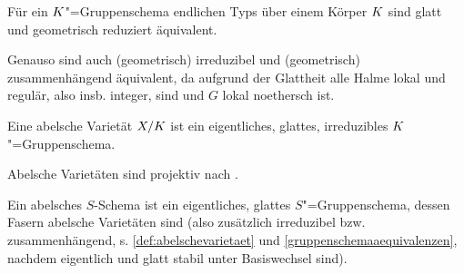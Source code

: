 \documentclass[german]{scrreprt}
\begin{document}
\begin{Definition}[$S$"=Gruppenschema]
\begin{Bemerkung}\label{gruppenschemaaequivalenzen}
    Für ein $K$"=Gruppenschema endlichen Typs über einem Körper $K$
    sind glatt und geometrisch reduziert äquivalent.
    
    Genauso sind auch (geometrisch) irreduzibel und (geometrisch)
    zusammenhängend äquivalent, da aufgrund der Glattheit alle Halme
    lokal und regulär, also insb. integer, sind und $G$ lokal noethersch
    ist.
  \end{Bemerkung}
\end{Definition}
\begin{Definition}\label{def:abelschevarietaet}
  Eine abelsche Varietät $X/K$ ist ein eigentliches, glattes,
  irreduzibles $K$"=Gruppenschema.


  \begin{Bemerkung}\label{thm:abvarietaetprojektiv}
    Abelsche Varietäten sind projektiv nach
    \cite[9.6, Proposition 4]{bosch}.
  \end{Bemerkung}
\end{Definition}

\begin{Definition}
  Ein abelsches $S$-Schema ist ein eigentliches, glattes $S$"=Gruppenschema,
  dessen Fasern abelsche Varietäten sind 
  (also zusätzlich irreduzibel bzw. zusammenhängend,
  s. \ref{def:abelschevarietaet} und \ref{gruppenschemaaequivalenzen},
  nachdem eigentlich und glatt stabil unter Basiswechsel sind).
\end{Definition}
\end{document}
